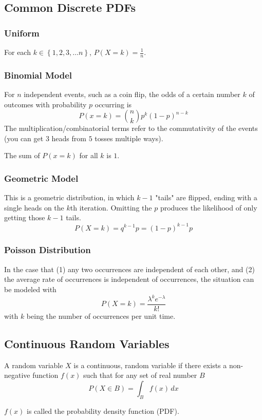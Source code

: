 \documentclass{article}
\begin{document}
\subsection{Common Discrete PDFs}
\subsubsection{Uniform} \label{uni}
For each $k\in\left\{1, 2, 3, \ldots n \right\}$, $P(X=k)=\frac{1}{n}$.

\subsubsection{Binomial Model}
For $n$ independent events, such as a coin flip, the odds of a certain number $k$ of outcomes with probability $p$ occurring is
$$P(x = k) = \binom{n}{k} p^k(1-p)^{n-k}$$
The multiplication/combinatorial terms refer to the commutativity of the events (you can get $3$ heads from $5$ tosses multiple ways).

The sum of $P(x=k)$ for all $k$ is $1$.

\subsubsection{Geometric Model}\label{geo}
This is a geometric distribution, in which $k-1$ "tails" are flipped, ending with a single heads on the $k$th iteration. Omitting the $p$ produces the likelihood of only getting those $k-1$ tails.
$$P(X=k)=q^{k-1}p = (1 - p)^{k-1}p$$

\subsubsection{Poisson Distribution}
In the case that (1) any two occurrences are independent of each other, and (2) the average rate of occurrences is independent of occurrences, the situation can be modeled with
$$P(X=k)=\frac{\lambda^ke^{-\lambda}}{k!}$$
with $k$ being the number of occurrences per unit time.

\subsection{Continuous Random Variables}
A random variable $X$ is a continuous, random variable if there exists a non-negative function $f(x)$ such that for any set of real number $B$
$$P(X \in B) = \int_B f(x)\,dx$$

$f(x)$ is called the probability density function (PDF).
\end{document}
